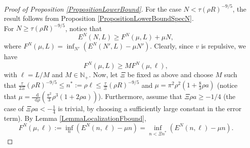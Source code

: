 \documentclass[a4paper,11pt]{article}
\newcommand*\diff{\mathop{}\!\mathrm{d}}
\numberwithin{equation}{section}
\begin{document}
	\begin{proof}[Proof of Proposition \ref{PropositionLowerBound}]
		For the case $ N<\tau (\rho R)^{-9/5} $, the result follows from Proposition \ref{PropositionLowerBoundSpecN}.\\
		For $ N\geq \tau (\rho R)^{-9/5} $, notice that \begin{equation}
			E^N(N,L)\geq F^N(\mu,L)+\mu N,
		\end{equation}
		where $ F^N(\mu,L)=\inf_{N'}\left(E^N(N',L)-\mu N'\right) $. Clearly, since $v$ is repulsive, we have \begin{equation}
			F^N(\mu,L)\geq M F^N(\mu,\ell)\label{EqLocalizationF},
		\end{equation}
		with $ \ell=L/M $ and $ M\in \mathbb{N}_+ $. 
		Now, let $\Xi$ be fixed as above and choose $ M $ such that $ \frac{\tau}{2\Xi}\left(\rho R\right)^{-9/5}\leq n^*:=\rho\ell\leq \frac{\tau}{\Xi}\left(\rho R\right)^{-9/5} $ and $ \mu=\pi^2\rho^2\left(1+\frac{8}{3}\rho a\right) $ (notice that $ \mu=\frac{\diff}{\diff \rho}(\frac{\pi^2}{3}\rho^3(1+2\rho a))$). Furthermore, assume that $\Xi\rho a\geq -1/4$ (the case of $ \Xi\rho a<-\frac{1}{4} $ is trivial, by choosing a sufficiently large constant in the error term). By Lemma \ref{LemmaLocalizationFbound},  \begin{equation}
			F^N(\mu,\ell):=\inf_{n}\left(E^N(n,\ell)-\mu n\right)=\inf_{n<\Xi n^*}\left(E^N(n,\ell)-\mu n\right).

\end{equation}
\end{proof}
\end{document}
